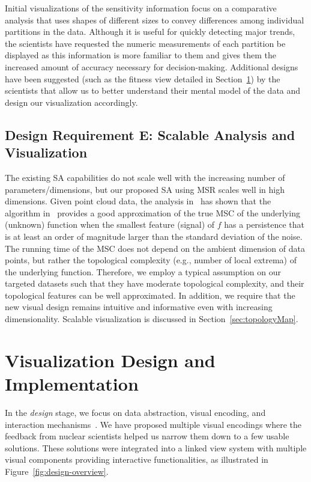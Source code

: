 Initial visualizations of the sensitivity information focus on a comparative analysis that uses shapes of different sizes to convey differences among individual  partitions in the data.
%
Although it is useful for quickly detecting major trends, the scientists have requested the numeric measurements of each partition be displayed as this information is more familiar to them and gives them the increased amount of accuracy necessary for decision-making.
%
Additional designs have been suggested (such as the fitness view detailed in Section~\ref{sec:saDesign}) by the scientists that allow us to better understand their mental model of the data and design our visualization accordingly.

\subsection{Design Requirement E: Scalable Analysis and Visualization}

The existing SA capabilities do not scale well with the increasing number of parameters/dimensions, but our proposed SA using MSR scales well in high dimensions.
%
Given point cloud data, the analysis in~\cite{GerberRubelBremer2011} has shown that the algorithm in~\cite{GerberBremerPascucci2010} provides a good approximation of the true MSC of the underlying (unknown) function when the smallest feature (signal) of $f$ has a persistence that is at least an order of magnitude larger than the standard deviation of the noise.
%
The running time of the MSC does not depend on the ambient dimension of data points, but rather the topological complexity (e.g., number of local extrema) of the underlying function.
%
Therefore, we employ a typical assumption on our targeted datasets such that they have moderate  topological complexity, and their topological features can be well approximated.
%
In addition, we require that the new visual design remains intuitive and informative even with increasing dimensionality.
%
Scalable visualization is discussed in Section~\ref{sec:topologyMap}.

\section{Visualization Design and Implementation}
\label{sec:saDesign}

In the \emph{design} stage, we focus on data abstraction, visual encoding, and interaction mechanisms~\cite{SedlmairMeyerMunzner2012}.
%
We have proposed multiple visual encodings where the feedback from nuclear scientists helped us narrow them down to a few usable solutions.
%
These solutions were integrated into a linked view system with multiple visual components providing interactive functionalities, as illustrated in Figure~\ref{fig:design-overview}.

